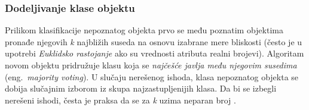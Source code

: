 \documentclass[12pt,oneside]{memoir}
\begin{document}

\subsubsection{Dodeljivanje klase objektu}
Prilikom klasifikacije nepoznatog objekta prvo se među poznatim objektima pronađe njegovih \textit{k} najbližih suseda na osnovu izabrane mere bliskosti (često je u upotrebi \textit{Euklidsko rastojanje} ako su vrednosti atributa realni brojevi). %
Algoritam novom objektu pridružuje klasu koja se \textit{najčešće javlja među njegovim susedima} (eng.~\textit{majority voting}). U slučaju nerešenog ishoda, klasa nepoznatog objekta se dobija slučajnim izborom iz skupa najzastupljenijih klasa. Da bi se izbegli nerešeni ishodi, česta je praksa da se za \textit{k} uzima neparan broj \cite{mitic, mladen, mlm}.%
\par
\end{document}
